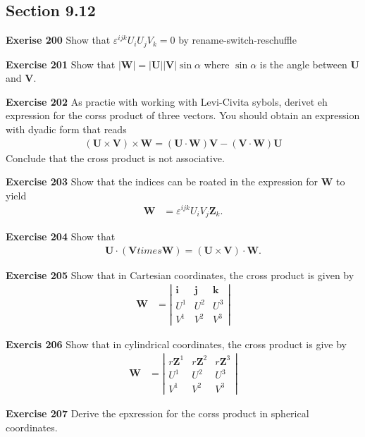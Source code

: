 \documentclass[12pt,a4paper]{report}
\newcommand{\VK}[1]{\textbf{#1}}
\begin{document}
\begin{description}
\section{Section 9.12}
\item \textbf{Exerise 200}  Show that $\varepsilon^{ijk}U_iU_jV_k = 0$ by rename-switch-reschuffle
\item \textbf{Exercise 201} Show that $|\VK{W}|=|\VK{U}||\VK{V}|\sin \alpha$ where $\sin\alpha$ is the angle between $\VK{U}$ and $\VK{V}$.
\item \textbf{Exercise 202} As practie with working with Levi-Civita sybols, derivet eh expression for the corss product of three vectors.  You should obtain an expression with dyadic form that reads
\begin{align*}
	(\textbf{U}\times \textbf{V})\times \textbf{W} = (\textbf{U}\cdot\textbf{W})\textbf{V} - (\textbf{V}\cdot\textbf{W})\textbf{U}
\end{align*}Conclude that the cross product is not associative.
\item \textbf{Exercise 203} Show that the indices can be roated in the expression for $\textbf{W}$ to yield
\begin{align*}
	\textbf{W} &= \varepsilon^{ijk}U_iV_j\textbf{Z}_k.
\end{align*}
\item \textbf{Exercise 204} Show that \begin{align*}
	\textbf{U}\cdot(\textbf{V}times \textbf{W}) = (\textbf{U}\times\textbf{V})\cdot\textbf{W}.
\end{align*}
\item \textbf{Exercise 205} Show that in Cartesian coordinates, the cross product is given by 
\begin{align*}
	\textbf{W} &= \left | \begin{array}{ccc}
		\textbf{i} & \textbf{j} & \textbf{k}\\
		U^1 & U^2 & U^3\\
		V^1 & V^2 & V^3
\end{array}	 \right |
\end{align*}
\item \textbf{Exercis 206} Show that in cylindrical coordinates, the cross product is give by  
\begin{align*}
	\textbf{W} &= \left | \begin{array}{ccc}
		r\textbf{Z}^1 & r\textbf{Z}^2 & r\textbf{Z}^3\\
		U^1 & U^2 & U^3\\
		V^1 & V^2 & V^3
\end{array}	 \right |
\end{align*}
\item \textbf{Exercise 207} Derive the epxression for the corss product in spherical coordinates.

\end{description}
\end{document}
